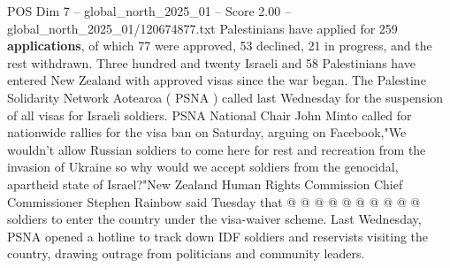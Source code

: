 \begin{textsample}{POS Dim 7 – global\_north\_2025\_01 – Score 2.00 – global\_north\_2025\_01/120674877.txt}
Palestinians have applied for 259 \textbf{applications}, of which 77 were approved, 53 declined, 21 in progress, and the rest withdrawn.
Three hundred and twenty Israeli and 58 Palestinians have entered New Zealand with approved visas since the war began.
The Palestine Solidarity Network Aotearoa ( PSNA ) called last Wednesday for the suspension of all visas for Israeli soldiers.
PSNA National Chair John Minto called for nationwide rallies for the visa ban on Saturday, arguing on Facebook,"We wouldn't allow Russian soldiers to come here for rest and recreation from the invasion of Ukraine so why would we accept soldiers from the genocidal, apartheid state of Israel?"New Zealand Human Rights Commission Chief Commissioner Stephen Rainbow said Tuesday that @ @ @ @ @ @ @ @ @ @ soldiers to enter the country under the visa-waiver scheme.
Last Wednesday, PSNA opened a hotline to track down IDF soldiers and reservists visiting the country, drawing outrage from politicians and community leaders.

\end{textsample}

